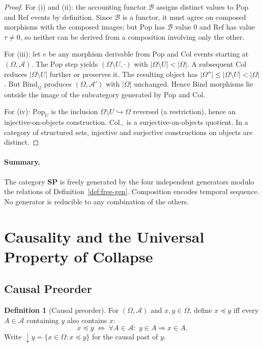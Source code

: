 \documentclass[12pt,a4paper]{article}
\theoremstyle{definition}
\newtheorem{definition}[theorem]{Definition}
\theoremstyle{remark}
\newcommand{\SP}{\mathbf{SP}}
\newcommand{\Pop}{\mathrm{Pop}}
\newcommand{\Ref}{\mathrm{Ref}}
\newcommand{\Bind}{\mathrm{Bind}}
\newcommand{\Col}{\mathrm{Col}}
\newcommand{\downset}[1]{\!\downarrow\!{#1}}
\begin{document}
\begin{proof}
For (i) and (ii): the accounting functor $\mathcal{B}$ assigns distinct values to
$\Pop$ and $\Ref$ events by definition. Since $\mathcal{B}$ is a functor, it must
agree on composed morphisms with the composed images; but $\Pop$ has $\mathcal{B}$
value $0$ and $\Ref$ has value $\tau\ne 0$, so neither can be derived from a
composition involving only the other.

For (iii): let $e$ be any morphism derivable from $\Pop$ and $\Col$ events starting
at $(\Omega,\mathcal{A})$. The $\Pop$ step yields $(\Omega\setminus U,\cdot)$ with
$|\Omega\setminus U|<|\Omega|$. A subsequent $\Col$ reduces $|\Omega\setminus U|$
further or preserves it. The resulting object has $|\Omega''|\le|\Omega\setminus U|
<|\Omega|$. But $\Bind_{ij}$ produces $(\Omega,\mathcal{A}')$ with $|\Omega|$
unchanged. Hence $\Bind$ morphisms lie outside the image of the subcategory generated
by $\Pop$ and $\Col$.

For (iv): $\Pop_U$ is the inclusion $\Omega\setminus U\hookrightarrow\Omega$ reversed
(a restriction), hence an injective-on-objects construction. $\Col_\sim$ is a
surjective-on-objects quotient. In a category of structured sets, injective and
surjective constructions on objects are distinct.
\end{proof}

\paragraph{Summary.} The category $\SP$ is freely generated by the four independent
generators modulo the relations of Definition~\ref{def:free-gen}. Composition encodes
temporal sequence. No generator is reducible to any combination of the others.

\section{Causality and the Universal Property of Collapse}
\label{sec:causality}

\subsection{Causal Preorder}

\begin{definition}[Causal preorder]
\label{def:causal-preorder}
For $(\Omega,\mathcal{A})$ and $x,y\in\Omega$, define $x\preceq y$ iff every
$A\in\mathcal{A}$ containing $y$ also contains $x$:
\[
  x\preceq y \;\iff\; \forall A\in\mathcal{A}:\; y\in A\Rightarrow x\in A.
\]
Write $\downset{y}=\{x\in\Omega:x\preceq y\}$ for the causal past of $y$.
\end{definition}
\end{document}
